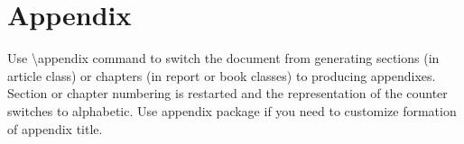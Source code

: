 \section{Appendix}

Use \textbackslash appendix command to switch the document from generating sections (in article class) or chapters (in report or book classes) to producing appendixes. Section or chapter numbering is restarted and the representation of the counter switches to alphabetic. Use appendix package if you need to customize formation of appendix title. 
